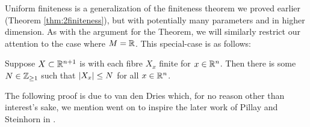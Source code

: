 Uniform finiteness is a generalization of the finiteness theorem we proved earlier (Theorem \ref{thm:2finiteness}), but with potentially many parameters and in higher dimension. As with the argument for the \CD Theorem, we will similarly restrict our attention to the case where $M = \mathbb{R}$. This special-case is as follows:

\begin{proposition}
  \label{prop:unif-finiteness}
  Suppose $X \subset \mathbb{R}^{n+1}$ is  with each fibre $X_x$ finite for $x \in \mathbb{R}^n$. Then there is some $N \in \mathbb{Z}_{\geq 1}$ such that $\vert X_x\vert \leq N$ for all $x \in \mathbb{R}^n$.
\end{proposition}


The following proof is due to van den Dries \cite{dries_remarks_1984} which, for no reason other than interest's sake, we mention went on to inspire the later work of Pillay and Steinhorn in \cite{pillay_definable_1986}.

